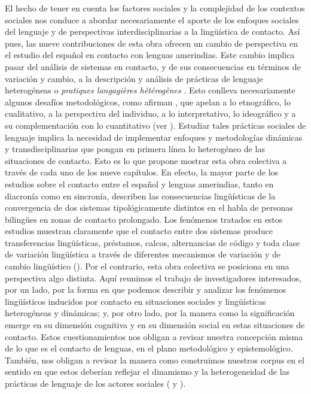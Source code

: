 \documentclass[output=paper]{langscibook}
\begin{document}
El hecho de tener en cuenta los factores sociales y la complejidad de los contextos sociales nos conduce a abordar necesariamente el aporte de los enfoques sociales del lenguaje y de perspectivas interdisciplinarias a la lingüística de contacto. Así pues, las nueve contribuciones de esta obra ofrecen un cambio de perspectiva en el estudio del español en contacto con lenguas amerindias. Este cambio implica pasar del análisis de sistemas en contacto, y de sus consecuencias en términos de variación y cambio, a la descripción y análisis de prácticas de lenguaje heterogéneas o \textit{pratiques langagières hétérogènes} \citep{Léglise2013}. Esto conlleva necesariamente algunos desafíos metodológicos, como afirman  \citet{BürkiPatzelt2020}, que apelan a lo etnográfico, lo cualitativo, a la perspectiva del individuo, a lo interpretativo, lo ideográfico y a su complementación con lo cuantitativo (ver ). Estudiar tales prácticas sociales de lenguaje implica la necesidad de implementar enfoques y metodologías dinámicas y transdisciplinarias que pongan en primera línea lo heterogéneo de las situaciones de contacto. Esto es lo que propone mostrar esta obra colectiva a través de cada uno de los nueve capítulos. En efecto, la mayor parte de los estudios sobre el contacto entre el español y lenguas amerindias, tanto en diacronía como en sincronía, describen las consecuencias lingüísticas de la convergencia de dos sistemas tipológicamente distintos en el habla de personas bilingües en zonas de contacto prolongado. Los fenómenos tratados en estos estudios muestran claramente que el contacto entre dos sistemas produce transferencias lingüísticas, préstamos, calcos, alternancias de código y toda clase de variación lingüística a través de diferentes mecanismos de variación y de cambio lingüístico (\citealt{DeGranda1997,Haboud1998,Escobar2000,PalaciosAlcaine2005,Olbertz2008,MermaMolina2008,Pfänder2009,PalaciosAlcaine2011,Muysken2011,Muntendam2013}). Por el contrario, esta obra colectiva se posiciona en una perspectiva algo distinta. Aquí reunimos el trabajo de investigadores interesados, por un lado, por la forma en que podemos describir y analizar los fenómenos lingüísticos inducidos por contacto en situaciones sociales y lingüísticas heterogéneas y dinámicas; y, por otro lado, por la manera como la significación emerge en su dimensión cognitiva y en su dimensión social en estas situaciones de contacto. Estos cuestionamientos nos obligan a revisar nuestra concepción misma de lo que es el contacto de lenguas, en el plano metodológico y epistemológico. También, nos obligan a revisar la manera como construimos nuestros corpus en el sentido en que estos deberían reflejar el dinamismo y la heterogeneidad de las prácticas de lenguaje de los actores sociales (\citealt{LégliseSánchezMoreano2017} y ).
\end{document}
